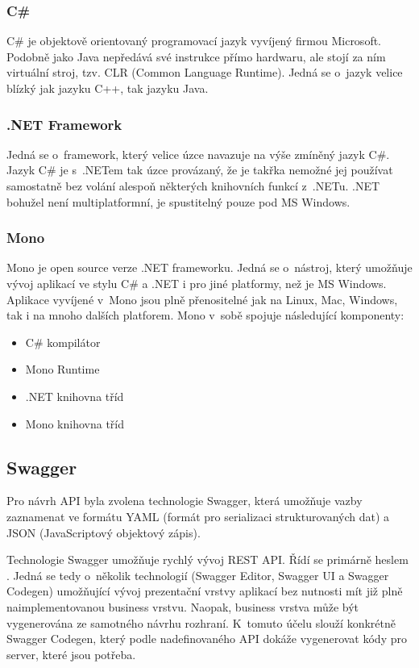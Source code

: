 \documentclass[thesis=B,czech]{FITthesis}[2012/06/26]
\begin{document}
	\subsubsection{C\#}
	C\# je objektově orientovaný programovací jazyk vyvíjený firmou Microsoft. Podobně jako Java nepředává své instrukce přímo hardwaru, ale stojí za ním virtuální stroj, tzv. CLR (Common Language Runtime). Jedná se o~jazyk velice blízký jak jazyku C++, tak jazyku Java.
	
	
	\subsubsection{.NET Framework}
	Jedná se o~framework, který velice úzce navazuje na výše zmíněný jazyk C\#. Jazyk C\# je s~.NETem tak úzce provázaný, že je takřka nemožné jej používat samostatně bez volání alespoň některých knihovních funkcí z~.NETu. .NET bohužel není multiplatformní, je spustitelný pouze pod MS Windows.
	
	\subsubsection{Mono}
Mono je open source verze .NET frameworku. Jedná se o~nástroj, který umožňuje vývoj aplikací ve stylu C\# a .NET i pro jiné platformy, než je MS Windows. Aplikace vyvíjené v~Mono jsou plně přenositelné jak na Linux, Mac, Windows, tak i na mnoho dalších platforem. Mono v~sobě spojuje následující komponenty:
	
	\begin{itemize}
	\item C\# kompilátor
	\item Mono Runtime
	\item .NET knihovna tříd
	\item Mono knihovna tříd \cite{mono}
	\end{itemize}
	
	
    \subsection{Swagger}
    
    Pro návrh API byla zvolena technologie Swagger, která umožňuje vazby zaznamenat ve formátu YAML (formát pro serializaci strukturovaných dat) a JSON (JavaScriptový objektový zápis).
    
    Technologie Swagger umožňuje rychlý vývoj REST API. Řídí se primárně heslem . Jedná se tedy o~několik technologií (Swagger Editor, Swagger UI a Swagger Codegen) umožňující vývoj prezentační vrstvy aplikací bez nutnosti mít již plně naimplementovanou business vrstvu. Naopak, business vrstva může být vygenerována ze samotného návrhu rozhraní. K~tomuto účelu slouží konkrétně Swagger Codegen, který podle nadefinovaného API dokáže vygenerovat kódy pro server, které jsou potřeba. \cite{swagger}
	
\end{document}
